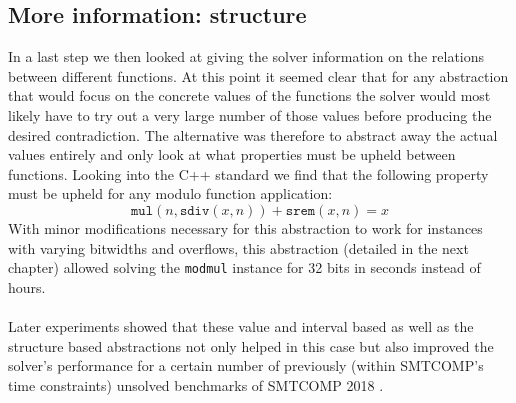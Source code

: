 \subsection{More information: structure}
In a last step we then looked at giving the solver information on the relations between different functions. At this point it seemed clear that for any abstraction that would focus on the concrete values of the functions the solver would most likely have to try out a very large number of those values before producing the desired contradiction. The alternative was therefore to abstract away the actual values entirely and only look at what properties must be upheld between functions. Looking into the C++ standard \cite{ISO14882:2011} we find that the following property must be upheld for any modulo function application:
\[
    \texttt{mul}\left( n, \texttt{sdiv}\left(x,n\right) \right) + \texttt{srem}\left(x,n\right) = x
\]
With minor modifications necessary for this abstraction to work for instances with varying bitwidths and overflows, this abstraction (detailed in the next chapter) allowed solving the \texttt{modmul} instance for 32 bits in seconds instead of hours.

\paragraph{}
Later experiments showed that these value and interval based as well as the structure based abstractions not only helped in this case but also improved the solver's performance for a certain number of previously (within SMTCOMP's time constraints) unsolved benchmarks of SMTCOMP 2018 \cite{SMTCOMP18}.
